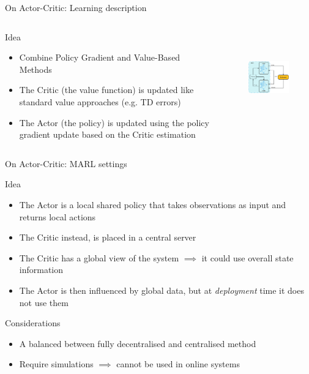 \documentclass[presentation]{beamer}\mode<presentation>{\usetheme{AMSBolognaFC}}
\begin{document}
\begin{frame}{On Actor-Critic: Learning description}
	\begin{columns}
		\begin{column}{0.5\textwidth}		
			\begin{alertblock}{Idea}
				\begin{itemize}
					\item Combine Policy Gradient and Value-Based Methods
					\item The Critic (the value function) is updated like standard value approaches (e.g. TD errors)
					\item The Actor (the policy) is updated using the policy gradient update based on the Critic estimation
				\end{itemize}
			\end{alertblock}
		\end{column}
		\begin{column}{0.5\textwidth}			
			\raggedleft
				\begin{figure}
					\includegraphics[height=4cm]{img/actor-critic.png}
				\end{figure}
		\end{column}
	\end{columns}
\end{frame}

\begin{frame}{On Actor-Critic: MARL settings}
	\begin{alertblock}{Idea}
		\begin{itemize}
			\item The Actor is a local shared policy that takes observations as input and returns local actions
			\item The Critic instead, is placed in a central server
			\item The Critic has a global view of the system $\implies$ it could use overall state information 
			\item The Actor is then influenced by global data, but at \emph{deployment} time it does not use them
		\end{itemize}
	\end{alertblock}
	\begin{exampleblock}{Considerations}
		\begin{itemize}
			\item[{\color{teal} \faThumbsUp}] A balanced between fully decentralised and centralised method
			\item[{\color{red} \faThumbsDown}] Require simulations $\implies$ cannot be used in online systems  
		\end{itemize}
	\end{exampleblock}
\end{frame}
\end{document}
